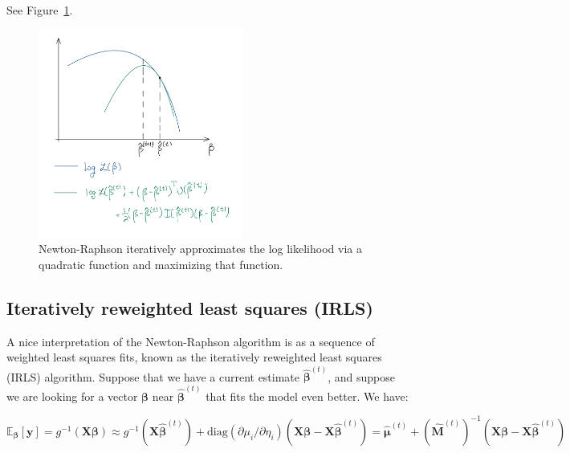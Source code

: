 \documentclass[
  11pt,
  letterpaper,
  oneside]{book}
\theoremstyle{definition}
\theoremstyle{plain}
\theoremstyle{plain}
\theoremstyle{plain}
\theoremstyle{remark}
\begin{document}
See Figure~\ref{fig-newton-raphson}.

\begin{figure}

{\centering \includegraphics[width=0.6\textwidth,height=\textheight]{figures/newton-raphson.jpeg}

}

\caption{\label{fig-newton-raphson}Newton-Raphson iteratively
approximates the log likelihood via a quadratic function and maximizing
that function.}

\end{figure}

\hypertarget{sec-irls-interpretation}{%
\subsection{Iteratively reweighted least squares
(IRLS)}\label{sec-irls-interpretation}}

A nice interpretation of the Newton-Raphson algorithm is as a sequence
of weighted least squares fits, known as the iteratively reweighted
least squares (IRLS) algorithm. Suppose that we have a current estimate
\(\boldsymbol{\widehat \beta}^{(t)}\), and suppose we are looking for a
vector \(\boldsymbol{\beta}\) near \(\boldsymbol{\widehat \beta}^{(t)}\)
that fits the model even better. We have:

\[
\mathbb{E}_{\boldsymbol{\beta}}[\boldsymbol{y}] = g^{-1}(\boldsymbol{X} \boldsymbol{\beta}) \approx g^{-1}(\boldsymbol{X} \boldsymbol{\widehat \beta}^{(t)}) + \text{diag}(\partial \mu_i/\partial \eta_i)(\boldsymbol{X} \boldsymbol{\beta} - \boldsymbol{X} \boldsymbol{\widehat \beta}^{(t)}) = \boldsymbol{\widehat \mu}^{(t)} + (\boldsymbol{\widehat M}^{(t)})^{-1}(\boldsymbol{X} \boldsymbol{\beta} - \boldsymbol{X} \boldsymbol{\widehat \beta}^{(t)})
\]
\end{document}
